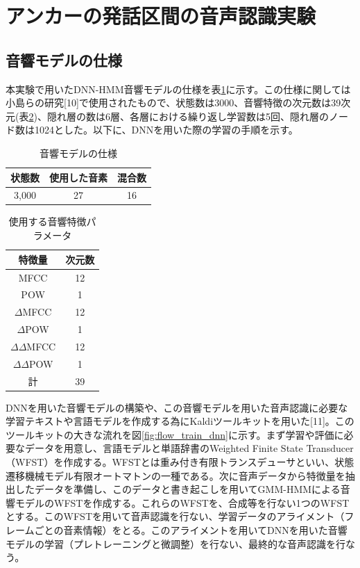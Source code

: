 \section{アンカーの発話区間の音声認識実験}
\subsection{音響モデルの仕様}
本実験で用いたDNN-HMM音響モデルの仕様を表\ref{table:acoustic_model_detail}に示す。この仕様に関しては小島らの研究[10]で使用されたもので、状態数は3000、音響特徴の次元数は39次元(表\ref{acoustic_model_feature})、隠れ層の数は6層、各層における繰り返し学習数は5回、隠れ層のノード数は1024とした。以下に、DNNを用いた際の学習の手順を示す。

\begin{table}[H]
  \begin{center}
    \caption{音響モデルの仕様 \label{table:acoustic_model_detail}}
    \begin{tabular}{|c|c|c|} \hline
     状態数  & 使用した音素 & 混合数 \\ \hline
     3,000  & 27 & 16 \\ \hline
    \end{tabular}
  \end{center}
\end{table}

\begin{table}[H]
  \begin{center}
    \caption{使用する音響特徴パラメータ \label{acoustic_model_feature}}
    \begin{tabular}{|c||c|} \hline
      特徴量 & 次元数\\ \hline
      MFCC & 12  \\ \hline
      POW & 1  \\ \hline
      $\Delta$MFCC & 12 \\ \hline
      $\Delta$POW & 1 \\ \hline
      $\Delta\Delta$MFCC & 12 \\ \hline
      $\Delta\Delta$POW & 1 \\ \hline
      計 & 39 \\ \hline
    \end{tabular}
  \end{center}
\end{table}

\vspace{0.2in}\par
DNNを用いた音響モデルの構築や、この音響モデルを用いた音声認識に必要な学習テキストや言語モデルを作成する為にKaldiツールキットを用いた[11]。このツールキットの大きな流れを図\ref{fig:flow_train_dnn}に示す。まず学習や評価に必要なデータを用意し、言語モデルと単語辞書のWeighted Finite State Transducer （WFST）を作成する。WFSTとは重み付き有限トランスデューサといい、状態遷移機械モデル有限オートマトンの一種である。次に音声データから特徴量を抽出したデータを準備し、このデータと書き起こしを用いてGMM-HMMによる音響モデルのWFSTを作成する。これらのWFSTを、合成等を行ない1つのWFSTとする。このWFSTを用いて音声認識を行ない、学習データのアライメント（フレームごとの音素情報）をとる。このアライメントを用いてDNNを用いた音響モデルの学習（プレトレーニングと微調整）を行ない、最終的な音声認識を行なう。

